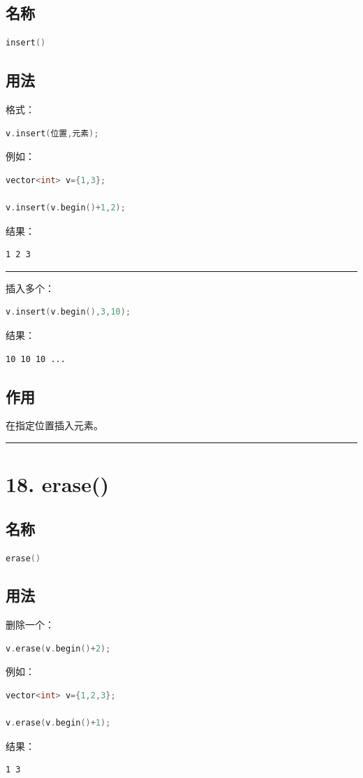 \documentclass[10pt,twocolumn]{extarticle}
\begin{document}
\subsection{名称}
\begin{lstlisting}[language=C++]
insert()
\end{lstlisting}

\subsection{用法}
格式：
\begin{lstlisting}[language=C++]
v.insert(位置,元素);
\end{lstlisting}
例如：
\begin{lstlisting}[language=C++]
vector<int> v={1,3};

v.insert(v.begin()+1,2);
\end{lstlisting}
结果：
\begin{lstlisting}
1 2 3
\end{lstlisting}

\noindent\rule{\linewidth}{0.4pt}

插入多个：
\begin{lstlisting}[language=C++]
v.insert(v.begin(),3,10);
\end{lstlisting}
结果：
\begin{lstlisting}
10 10 10 ...
\end{lstlisting}

\subsection{作用}
在指定位置插入元素。

\noindent\rule{\linewidth}{0.4pt}

\section{18. erase()}

\subsection{名称}
\begin{lstlisting}[language=C++]
erase()
\end{lstlisting}

\subsection{用法}
删除一个：
\begin{lstlisting}[language=C++]
v.erase(v.begin()+2);
\end{lstlisting}
例如：
\begin{lstlisting}[language=C++]
vector<int> v={1,2,3};

v.erase(v.begin()+1);
\end{lstlisting}
结果：
\begin{lstlisting}
1 3
\end{lstlisting}
\end{document}
